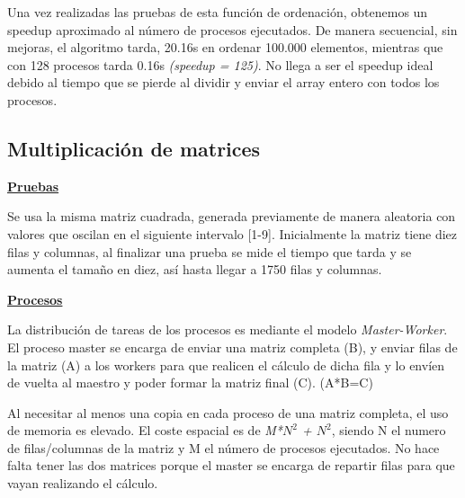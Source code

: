 		Una vez realizadas las pruebas de esta función de ordenación, obtenemos un speedup aproximado al número de procesos ejecutados. De manera secuencial, sin mejoras, el algoritmo tarda, 20.16s en ordenar 100.000 elementos, mientras que con 128 procesos tarda 0.16s \textit{(speedup = 125)}. No llega a ser el speedup ideal debido al tiempo que se pierde al dividir y enviar el array entero con todos los procesos.
		


	\subsection{Multiplicación de matrices}
	
	\begin{flushleft}
	\begin{mdframed}[roundcorner=5pt]	
	
		\textbf{\underline{Pruebas}}
		\vspace{0.1cm}
	
		\scriptsize	
		Se usa la misma matriz cuadrada, generada previamente de manera aleatoria con valores que oscilan en el siguiente intervalo [1-9]. Inicialmente la matriz tiene diez filas y columnas, al finalizar una prueba se mide el tiempo que tarda y se aumenta el tamaño en diez, así hasta llegar a 1750 filas y columnas.\\		
		
	
		\normalsize
		
		\textbf{\underline{Procesos}}
		
		\vspace{0.1cm}
		
		\scriptsize	
		La distribución de tareas de los procesos es mediante el modelo \textit{Master-Worker}. El proceso master se encarga de enviar una matriz completa (B), y enviar filas de la matriz (A) a los workers para que realicen el cálculo de dicha fila y lo envíen de vuelta al maestro y poder formar la matriz final (C). (A*B=C)
	
	\end{mdframed}
	\end{flushleft}		
	
		Al necesitar al menos una copia en cada proceso de una matriz completa, el uso de memoria es elevado. El  coste espacial es de \textit{M*\(N^{2}\) + \(N^{2}\)}, siendo N el numero de filas/columnas de la matriz y M el número de procesos ejecutados. No hace falta tener las dos matrices porque el master se encarga de repartir filas para que vayan realizando el cálculo.
		
